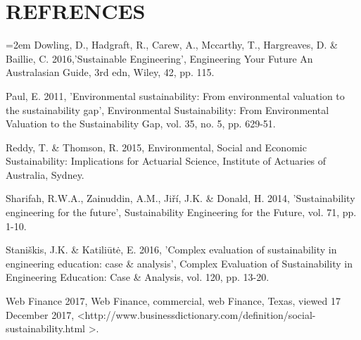 \documentclass{article}
\begin{document}
\section{REFRENCES}\label{refrences}
\begin{flushleft}

\hangindent=2em
Dowling, D., Hadgraft, R., Carew, A., Mccarthy, T., Hargreaves, D. \& Baillie, C. 2016,'Sustainable Engineering', Engineering Your Future An Australasian Guide, 3rd edn, Wiley, 42, pp. 115.\linebreak

Paul, E. 2011, 'Environmental sustainability: From environmental valuation to the sustainability gap', Environmental Sustainability: From 
Environmental Valuation to the Sustainability Gap, vol. 35, no. 5, pp. 629-51.\linebreak


Reddy, T. \& Thomson, R. 2015, Environmental, Social and Economic Sustainability: Implications for Actuarial Science, Institute of Actuaries of Australia, Sydney.\linebreak


Sharifah, R.W.A., Zainuddin, A.M., Jiří, J.K. \& Donald, H. 2014, 'Sustainability engineering for the future', Sustainability Engineering for the Future, vol. 71, pp. 1-10.\linebreak


Staniškis, J.K. \& Katiliūtė, E. 2016, 'Complex evaluation of sustainability in engineering education: case \& analysis', Complex Evaluation of Sustainability in Engineering Education: Case \& Analysis, vol. 120, pp. 13-20.\linebreak


Web Finance 2017, Web Finance, commercial, web Finance, Texas, viewed 17 December 2017, \textless http://www.businessdictionary.com/definition/social-sustainability.html \textgreater.

\pagebreak
\end{flushleft}
\end{document}

